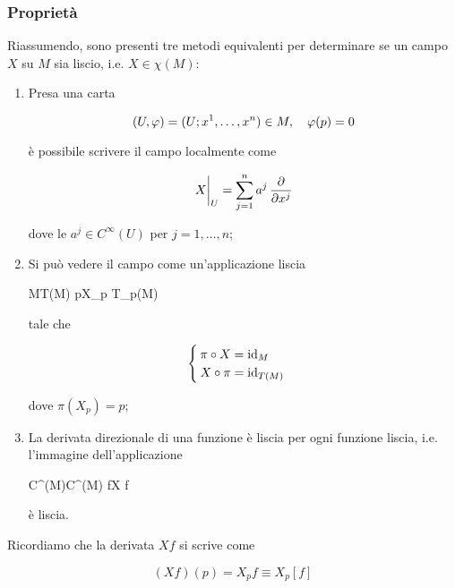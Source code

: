 \subsubsection{Proprietà}

Riassumendo, sono presenti tre metodi equivalenti per determinare se un campo $ X $ su $ M $ sia liscio, i.e. $ X \in \chi(M) $:

\begin{enumerate}
	\item Presa una carta
	
	\begin{equation}
		(U,\varphi) = (U; x^{1},\dots,x^{n}) \in M \qcomma \varphi(p) = 0
	\end{equation}
	
	è possibile scrivere il campo localmente come
	
	\begin{equation}
		\eval{X}_{U} = \sum_{j=1}^{n} a^{j} \, \pdv{x^{j}}
	\end{equation}

	dove le $ a^{j} \in C^{\infty}(U) $ per $ j=1,\dots,n $;
	
	
	\item Si può vedere il campo come un'applicazione liscia
	
		{M}{T(M)}
		{p}{X_{p} \in T_{p}(M)}
	
	tale che
	
	\begin{equation}
		\begin{cases}
			\pi \circ X = \operatorname{id}_{M} \\
			X \circ \pi = \operatorname{id}_{T(M)}
		\end{cases}
	\end{equation}	
	
	dove $ \pi(X_{p}) = p $;
	
	
	\item La derivata direzionale di una funzione è liscia per ogni funzione liscia, i.e. l'immagine dell'applicazione
	
		{C^{\infty}(M)}{C^{\infty}(M)}
		{f}{X f}

	è liscia.
\end{enumerate}

Ricordiamo che la derivata $ X f $ si scrive come

\begin{equation}
	(X f)(p) = X_{p} f \equiv X_{p} [f]
\end{equation}

